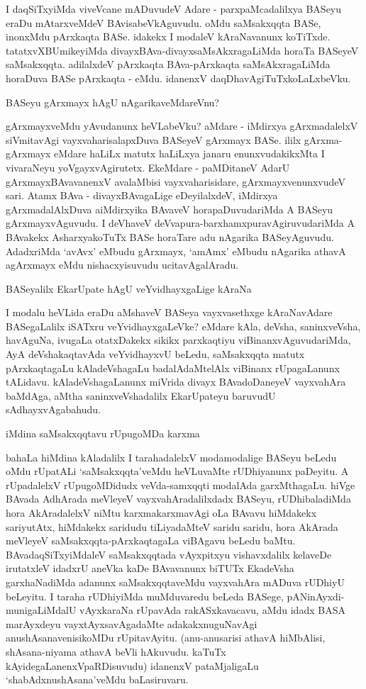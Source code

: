I daqSiTxyiMda viveVcane mADuvudeV Adare - parxpaMcadalilxya BASeyu eraDu mAtarxveMdeV BAvisabeVkAguvudu. oMdu saMsakxqqta BASe, inonxMdu pArxkaqta BASe. idakekx I modaleV kAraNavanunx koTiTxde. tatatxvXBUmikeyiMda divayxBAva-divayxsaMsAkxragaLiMda horaTa BASeyeV saMsakxqqta. adilalxdeV pArxkaqta BAva-pArxkaqta saMsAkxragaLiMda horaDuva BASe pArxkaqta - eMdu. idanenxV daqDhavAgiTuTxkoLaLxbeVku.

BASeyu gArxmayx hAgU nAgarikaveMdareVnu?

gArxmayxveMdu yAvudanunx heVLabeVku? aMdare - iMdirxya gArxmadalelxV siVmitavAgi vayxvaharisalapxDuva BASeyeV gArxmayx BASe. ililx gArxma-gArxmayx eMdare haLiLx matutx haLiLxya janaru enunxvudakikxMta I vivaraNeyu yoVgayxvAgirutetx. EkeMdare - paMDitaneV AdarU gArxmayxBAvavanenxV avalaMbisi vayxvaharisidare, gArxmayxvenunxvudeV sari. Atamx BAva - divayxBAvagaLige eDeyilalxdeV, iMdirxya gArxmadalAlxDuva aiMdirxyika BAvaveV horapaDuvudariMda A BASeyu gArxmayxvAguvudu. I deVhaveV deVvapura-barxhamxpuravAgiruvudariMda A BAvakekx AsharxyakoTuTx BASe horaTare adu nAgarika BASeyAguvudu. AdadxriMda `avAvx' eMbudu gArxmayx, `amAmx' eMbudu nAgarika athavA agArxmayx eMdu nishacxyisuvudu ucitavAgalAradu. 

BASeyalilx EkarUpate hAgU veYvidhayxgaLige kAraNa

I modalu heVLida eraDu aMshaveV BASeya vayxvasethxge kAraNavAdare BASegaLalilx iSATxru veYvidhayxgaLeVke? eMdare kAla, deVsha, saninxveVsha, havAguNa, ivugaLa otatxDakekx sikikx parxkaqtiyu viBinanxvAguvudariMda, AyA deVshakaqtavAda veYvidhayxvU beLedu, saMsakxqqta matutx pArxkaqtagaLu kAladeVshagaLu badalAdaMtelAlx viBinanx rUpagaLanunx tALidavu. kAladeVshagaLanunx miVrida divayx BAvadoDaneyeV vayxvahAra baMdAga, aMtha saninxveVshadalilx EkarUpateyu baruvudU sAdhayxvAgabahudu.

iMdina saMsakxqqtavu rUpugoMDa karxma

bahaLa hiMdina kAladalilx I tarahadalelxV modamodalige BASeyu beLedu oMdu rUpatALi `saMsakxqqta'veMdu heVLuvaMte rUDhiyanunx paDeyitu. A rUpadalelxV rUpugoMDidudx veVda-samxqqti modalAda garxMthagaLu. hiVge BAvada AdhArada meVleyeV vayxvahAradalilxdadx BASeyu, rUDhibaladiMda hora AkAradalelxV niMtu karxmakarxmavAgi oLa BAvavu hiMdakekx sariyutAtx, hiMdakekx saridudu tiLiyadaMteV saridu saridu, hora AkArada meVleyeV saMsakxqqta-pArxkaqtagaLa viBAgavu beLedu baMtu. BAvadaqSiTxyiMdaleV saMsakxqqtada vAyxpitxyu vishavxdalilx kelaveDe irutatxleV idadxrU aneVka kaDe BAvavanunx biTUTx EkadeVsha garxhaNadiMda adanunx saMsakxqqtaveMdu vayxvahAra mADuva rUDhiyU beLeyitu. I taraha rUDhiyiMda muMduvaredu beLeda BASege, pANinAyxdi-munigaLiMdalU vAyxkaraNa rUpavAda rakASxkavacavu, aMdu idadx BASA marAyxdeyu vayxtAyxsavAgadaMte adakakxnuguNavAgi anushAsanavenisikoMDu rUpitavAyitu. (anu-anusarisi athavA hiMbAlisi, shAsana-niyama athavA beVli hAkuvudu. kaTuTx kAyidegaLanenxVpaRDisuvudu) idanenxV pataMjaligaLu `shabAdxnushAsana'veMdu baLasiruvaru.

